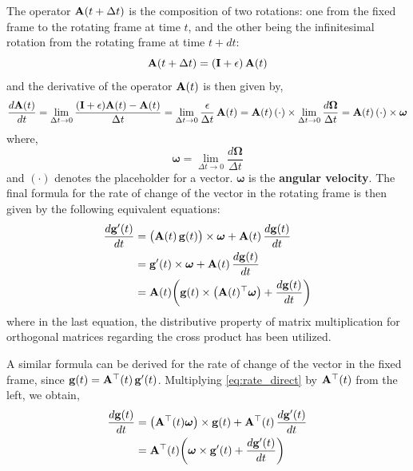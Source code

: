 \documentclass[12pt]{article}
\begin{document}
The operator $\vb{A}(t+\Delta t)$ is the composition of two rotations: one from the fixed
frame to the rotating frame at time $t$, and the other being the infinitesimal rotation from
the rotating frame at time $t + dt$:
\begin{equation}
  \vb{A}(t+\Delta t) = (\vb{I} + \epsilon)\,\vb{A}(t)
\end{equation}
and the derivative of the operator $\vb{A}(t)$ is then given by,
\begin{equation}
  \frac{d\vb{A}(t)}{dt}
  = \lim_{\Delta t\to 0}\frac{(\vb{I}+\epsilon)\vb{A}(t) - \vb{A}(t)}{\Delta t}
  = \lim_{\Delta t\to 0}\frac{\epsilon}{\Delta t}\,\vb{A}(t)
  = \vb{A}(t)\,(\cdot)\times\lim_{\Delta t\to 0}\frac{d\boldsymbol{\Omega}}{\Delta t}
  = \vb{A}(t)\,(\cdot)\times\boldsymbol{\omega}
\end{equation}
where,
\begin{equation}
  \boldsymbol{\omega} = \lim_{\Delta t\to 0}\frac{d\boldsymbol{\Omega}}{\Delta t}
\end{equation}
and $(\cdot)$ denotes the placeholder for a vector. $\boldsymbol{\omega}$ is the
\textbf{angular velocity}. The final formula for the rate of change of the vector in the
rotating frame is then given by the following equivalent equations:
\begin{align}
  \frac{d\vb{g}'(t)}{dt}
    &= \bigl(\vb{A}(t)\,\vb{g}(t)\bigr) \times \boldsymbol{\omega}
       + \vb{A}(t)\,\frac{d\vb{g}(t)}{dt} \nonumber \\
    &= \vb{g}'(t) \times \boldsymbol{\omega} + \vb{A}(t)\,\frac{d\vb{g}(t)}{dt} \nonumber \\
    &= \vb{A}(t)\!\left(\vb{g}(t) \times \bigl(\vb{A}(t)^\top\boldsymbol{\omega}\bigr)
       + \frac{d\vb{g}(t)}{dt}\right)
  \label{eq:rate_direct}
\end{align}
where in the last equation, the distributive property of matrix multiplication for orthogonal
matrices regarding the cross product has been utilized.

A similar formula can be derived for the rate of change of the vector in the fixed frame,
since $\vb{g}(t) = \vb{A}^\top(t)\,\vb{g}'(t)$. Multiplying \eqref{eq:rate_direct} by
$\vb{A}^\top(t)$ from the left, we obtain,
\begin{align}
  \frac{d\vb{g}(t)}{dt}
    &= \bigl(\vb{A}^\top(t)\boldsymbol{\omega}\bigr) \times \vb{g}(t)
       + \vb{A}^\top(t)\,\frac{d\vb{g}'(t)}{dt} \nonumber \\
    &= \vb{A}^\top(t)\!\left(\boldsymbol{\omega} \times \vb{g}'(t)
       + \frac{d\vb{g}'(t)}{dt}\right)
  \label{eq:rate_inverse}
\end{align}
\end{document}

